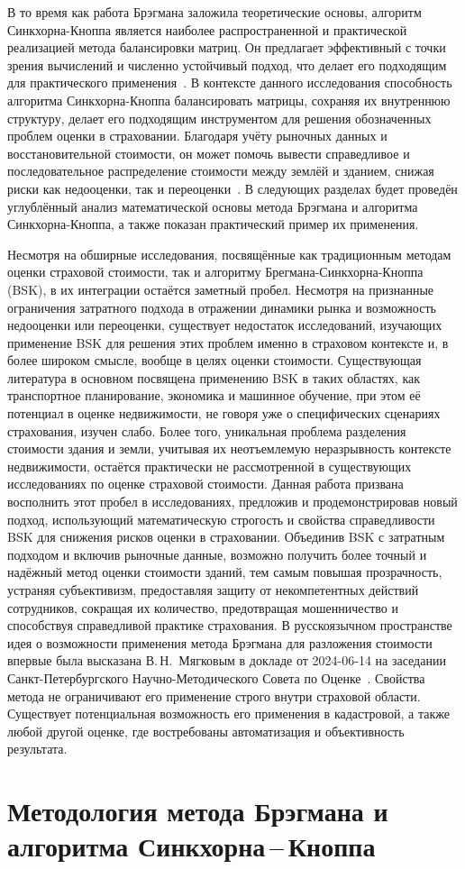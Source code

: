 \documentclass[12pt]{scrartcl}
\begin{document}
В то время как работа Брэгмана заложила теоретические основы, алгоритм Синкхорна-Кноппа является наиболее распространенной и практической реализацией метода балансировки матриц. Он предлагает эффективный с точки зрения вычислений и численно устойчивый подход, что делает его подходящим для практического применения~\cite{Djuric2012}. В контексте данного исследования способность алгоритма Синкхорна-Кноппа балансировать матрицы, сохраняя их внутреннюю структуру, делает его подходящим инструментом для решения обозначенных проблем оценки в страховании. Благодаря учёту рыночных данных и восстановительной стоимости, он может помочь вывести справедливое и последовательное распределение стоимости между землёй и зданием, снижая риски как недооценки, так и переоценки~\cite{Knight2008}. В следующих разделах будет проведён углублённый анализ математической основы метода Брэгмана и алгоритма Синкхорна-Кноппа, а также показан практический пример их применения.

Несмотря на обширные исследования, посвящённые как традиционным методам оценки страховой стоимости, так и алгоритму Брегмана-Синкхорна-Кноппа (BSK), в их интеграции остаётся заметный пробел. Несмотря на признанные ограничения затратного подхода в отражении динамики рынка и возможность недооценки или переоценки, существует недостаток исследований, изучающих применение BSK для решения этих проблем именно в страховом контексте и, в более широком смысле, вообще в целях оценки стоимости. Существующая литература в основном посвящена применению BSK в таких областях, как транспортное планирование, экономика и машинное обучение, при этом её потенциал в оценке недвижимости, не говоря уже о специфических сценариях страхования, изучен слабо. Более того, уникальная проблема разделения стоимости здания и земли, учитывая их неотъемлемую неразрывность контексте недвижимости, остаётся практически не рассмотренной в существующих исследованиях по оценке страховой стоимости. Данная работа призвана восполнить этот пробел в исследованиях, предложив и продемонстрировав новый подход, использующий математическую строгость и свойства справедливости BSK для снижения рисков оценки в страховании. Объединив BSK с затратным подходом и включив рыночные данные, возможно получить более точный и надёжный метод оценки стоимости зданий, тем самым повышая прозрачность, устраняя субъективизм, предоставляя защиту от некомпетентных действий сотрудников, сокращая их количество, предотвращая мошенничество и способствуя справедливой практике страхования. В русскоязычном пространстве идея о возможности применения метода Брэгмана для разложения стоимости впервые была высказана В.\,Н.~Мягковым в докладе от 2024-06-14 на заседании Санкт-Петербургского Научно-Методического Совета по Оценке~\cite{Myagkov202409051, Myagkov202409052}. Свойства метода не ограничивают его применение строго внутри страховой области. Существует потенциальная возможность его применения в кадастровой, а также любой другой оценке, где востребованы автоматизация и объективность результата.

\section{Методология метода Брэгмана и алгоритма Синкхорна\,--\,Кноппа}\label{sec:Methodology}








\printbibliography
\end{document}
